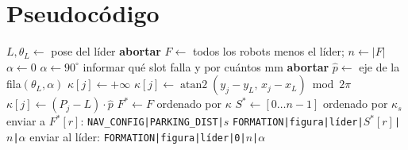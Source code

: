\documentclass[11pt,a4paper]{article}
\theoremstyle{plain}
\newcommand{\cmd}[1]{\texttt{#1}}
\newcommand{\pp}{\hat{p}}
\begin{document}
\section{Pseudocódigo}

\begin{algorithm}[H]
\caption{Reparto de slots (estación base, una sola vez)}
\label{alg:base}
\begin{algorithmic}[1]
  \State $L, \theta_L \gets$ pose del líder
   \State \textbf{abortar} \EndIf
  \State $F \gets$ todos los robots menos el líder; \quad $n \gets |F|$
  \State $\alpha \gets 0$
  \Statex
      \State $\alpha \gets 90^\circ$
    \Else
      \State informar qué slot falla y por cuántos mm
      \State \textbf{abortar}
    \EndIf
  \EndIf
  \Statex
  \State $\pp \gets$ eje de la fila$(\theta_L, \alpha)$
      \State $\kappa[j] \gets +\infty$
      \State $\kappa[j] \gets \operatorname{atan2}(y_j - y_L,\, x_j - x_L)
             \bmod 2\pi$
    \Else
      \State $\kappa[j] \gets (P_j - L)\cdot\pp$
    \EndIf
  \EndFor
  \State $F^{*} \gets F$ ordenado por $\kappa$
  \State $S^{*} \gets [0 \dots n-1]$ ordenado por $\kappa_s$
  \Statex
    \State enviar a $F^{*}[r]$: \cmd{NAV\_CONFIG|PARKING\_DIST|$s$}
    \State {} \cmd{FORMATION|figura|líder|$S^{*}[r]$|$n$|$\alpha$}
  \EndFor
  \State enviar al líder: \cmd{FORMATION|figura|líder|0|$n$|$\alpha$}
\EndProcedure
\end{algorithmic}
\end{algorithm}
\end{document}
